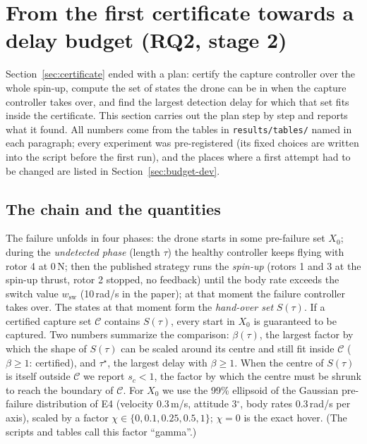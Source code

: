 \section{From the first certificate towards a delay budget (RQ2, stage 2)}\label{sec:budget}
Section~\ref{sec:certificate} ended with a plan: certify the capture controller over the whole spin-up, compute the set of states the drone can be in when the capture controller takes over, and find the largest detection delay for which that set fits inside the certificate. This section carries out the plan step by step and reports what it found. All numbers come from the tables in \texttt{results/tables/} named in each paragraph; every experiment was pre-registered (its fixed choices are written into the script before the first run), and the places where a first attempt had to be changed are listed in Section~\ref{sec:budget-dev}.

\subsection{The chain and the quantities}
The failure unfolds in four phases: the drone starts in some pre-failure set $X_0$; during the \emph{undetected phase} (length $\tau$) the healthy controller keeps flying with rotor 4 at 0\,N; then the published strategy runs the \emph{spin-up} (rotors 1 and 3 at the spin-up thrust, rotor 2 stopped, no feedback) until the body rate exceeds the switch value $w_{\mathrm{sw}}$ (10\,rad/s in the paper); at that moment the failure controller takes over. The states at that moment form the \emph{hand-over set} $S(\tau)$. If a certified capture set $\mathcal C$ contains $S(\tau)$, every start in $X_0$ is guaranteed to be captured. Two numbers summarize the comparison: $\beta(\tau)$, the largest factor by which the shape of $S(\tau)$ can be scaled around its centre and still fit inside $\mathcal C$ ($\beta\ge1$: certified), and $\tau^\star$, the largest delay with $\beta\ge1$. When the centre of $S(\tau)$ is itself outside $\mathcal C$ we report $s_c<1$, the factor by which the centre must be shrunk to reach the boundary of $\mathcal C$. For $X_0$ we use the 99\% ellipsoid of the Gaussian pre-failure distribution of E4 (velocity 0.3\,m/s, attitude 3$^\circ$, body rates 0.3\,rad/s per axis), scaled by a factor $\chi\in\{0, 0.1, 0.25, 0.5, 1\}$; $\chi=0$ is the exact hover. (The scripts and tables call this factor ``gamma''.)

